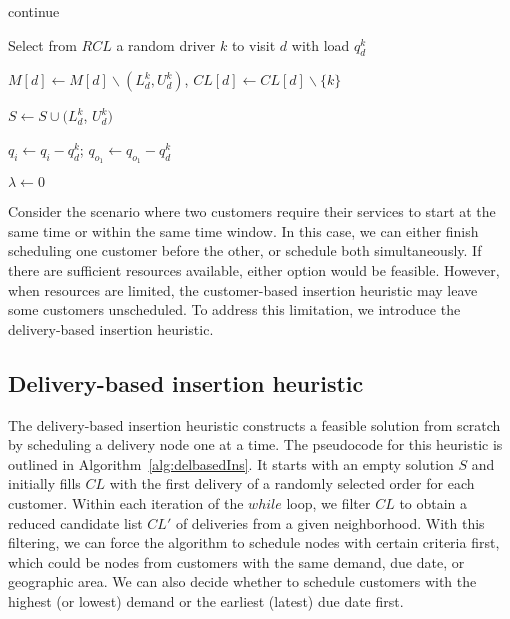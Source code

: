 \documentclass{article}
\begin{document}
{\begin{algorithm}[htbp]
{{{{                continue 

            }
            Select from $RCL$ a random driver $k$ to visit $d$ with load $q^k_d$

            $M[d]\leftarrow M[d] \backslash (L^k_{d}, U^k_{d})$, $CL[d]\leftarrow CL[d] \backslash \{k\} $

            $S \leftarrow S \cup (L^k_{d}$, $U^k_{d})  $

            $q_i \leftarrow q_i-q^k_{d}$;  $q_{o_1} \leftarrow q_{o_1}-q^k_{d}$

            $\lambda \leftarrow 0$

            }
            }
            }

        \end{algorithm}
    }

Consider the scenario where two customers require their services to start at the same time or within the same time window. In this case, we can either finish scheduling one customer before the other, or schedule both simultaneously.  If there are sufficient resources available, either option would be feasible. However, when resources are limited, the customer-based insertion heuristic may leave some customers unscheduled. To address this limitation, we introduce the delivery-based insertion heuristic.

\subsection{Delivery-based insertion heuristic}

The delivery-based insertion heuristic constructs a feasible solution from scratch by scheduling a delivery node one at a time. The pseudocode for this heuristic is outlined in Algorithm~\ref{alg:delbasedIns}. It starts with an empty solution $S$ and initially fills $CL$ with the first delivery of a randomly selected order for each customer. Within each iteration of the $while$ loop, we filter $CL$ to obtain a reduced candidate list $CL'$ of deliveries from a given neighborhood. With this filtering, we can force the algorithm to schedule nodes with certain criteria first, which could be nodes from customers with the same demand, due date, or geographic area. We can also decide whether to schedule customers with the highest (or lowest) demand or the earliest (latest) due date first.
\end{document}
